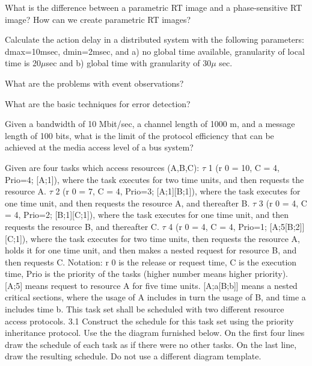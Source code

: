 
 What is the difference between a parametric RT image and a phase-sensitive RT image?
How can we create parametric RT images?

\pagebreak



Calculate the action delay in a distributed system with the following parameters:
dmax=10msec, dmin=2msec,
and a) no global time available, granularity of local time is 20$\mu$sec
and b) global time with granularity of 30$\mu$ sec.


What are the problems with event observations?

\pagebreak


What are the basic techniques for error detection?


Given a bandwidth of 10 Mbit/sec, a channel length of 1000 m, and a message length of 100
bits, what is the limit of the protocol efficiency that can be achieved at the media access
level of a bus system?


Given are four tasks which access resources (A,B,C):
$\tau$ 1 (r 0 = 10, C = 4, Prio=4; [A;1]), where the task executes for two time units, and then requests
the resource A.
$\tau$ 2 (r 0 = 7, C = 4, Prio=3; [A;1][B;1]), where the task executes for one time unit, and then
requests the resource A, and thereafter B.
$\tau$ 3 (r 0 = 4, C = 4, Prio=2; [B;1][C;1]), where the task executes for one time unit, and then
requests the resource B, and thereafter C.
$\tau$ 4 (r 0 = 4, C = 4, Prio=1; [A;5[B;2]][C;1]), where the task executes for two time units, then
requests the resource A, holds it for one time unit, and then makes a nested request for resource
B, and then requests C.
Notation: r 0 is the release or request time, C is the execution time, Prio is the priority of the tasks
(higher number means higher priority). [A;5] means request to resource A for five time units.
[A;a[B;b]] means a nested critical sections, where the usage of A includes in turn the usage of B,
and time a includes time b.
This task set shall be scheduled with two different resource access protocols.
3.1 Construct the schedule for this task set using the priority inheritance protocol. Use the the
diagram furnished below. On the first four lines draw the schedule of each task as if there
were no other tasks. On the last line, draw the resulting schedule. Do not use a different
diagram template.

